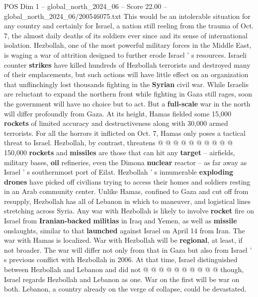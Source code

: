 \begin{textsample}{POS Dim 1 – global\_north\_2024\_06 – Score 22.00 – global\_north\_2024\_06/200546075.txt}  \label{ex:f1_pos_314}
This would be an intolerable situation for any country and certainly for Israel, a nation still reeling from the trauma of Oct. 7, the almost daily deaths of its soldiers ever since and its sense of international isolation.
Hezbollah, one of the most powerful military forces in the Middle East, is waging a war of attrition designed to further erode Israel ' s resources.
Israeli counter \textbf{strikes} have killed hundreds of Hezbollah terrorists and destroyed many of their emplacements, but such actions will have little effect on an organization that unflinchingly lost thousands fighting in the \textbf{Syrian} civil war.
While Israelis are reluctant to expand the northern front while fighting in Gaza still rages, soon the government will have no choice but to act.
But a \textbf{full-scale} war in the north will differ profoundly from Gaza.
At its height, Hamas fielded some 15,000 \textbf{rockets} of limited accuracy and destructiveness along with 30,000 armed terrorists.
For all the horrors it inflicted on Oct. 7, Hamas only poses a tactical threat to Israel.
Hezbollah, by contrast, threatens @ @ @ @ @ @ @ @ @ @ 150,000 \textbf{rockets} and \textbf{missiles} are those that can hit any \textbf{target} -- airfields, military bases, \textbf{oil} refineries, even the Dimona \textbf{nuclear} reactor -- as far away as Israel ' s southernmost port of Eilat.
Hezbollah ' s innumerable \textbf{exploding} \textbf{drones} have picked off civilians trying to access their homes and soldiers resting in an Arab community center.
Unlike Hamas, confined to Gaza and cut off from resupply, Hezbollah has all of Lebanon in which to maneuver, and logistical lines stretching across Syria.
Any war with Hezbollah is likely to involve \textbf{rocket} fire on Israel from \textbf{Iranian-backed} \textbf{militias} in Iraq and Yemen, as well as \textbf{missile} onslaughts, similar to that \textbf{launched} against Israel on April 14 from Iran.
The war with Hamas is localized.
War with Hezbollah will be \textbf{regional}, at least, if not broader.
The war will differ not only from that in Gaza but also from Israel ' s previous conflict with Hezbollah in 2006.
At that time, Israel distinguished between Hezbollah and Lebanon and did not @ @ @ @ @ @ @ @ @ @ though, Israel regards Hezbollah and Lebanon as one.
War on the first will be war on both.
Lebanon, a country already on the verge of collapse, could be devastated.

\end{textsample}
